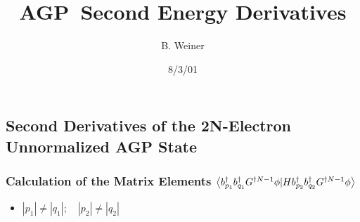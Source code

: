 

\newtheorem{theorem}{Theorem}
\newtheorem{acknowledgement}[theorem]{Acknowledgement}
\newtheorem{algorithm}[theorem]{Algorithm}
\newtheorem{axiom}[theorem]{Axiom}
\newtheorem{claim}[theorem]{Claim}
\newtheorem{conclusion}[theorem]{Conclusion}
\newtheorem{condition}[theorem]{Condition}
\newtheorem{conjecture}[theorem]{Conjecture}
\newtheorem{corollary}[theorem]{Corollary}
\newtheorem{criterion}[theorem]{Criterion}
\newtheorem{definition}[theorem]{Definition}
\newtheorem{example}[theorem]{Example}
\newtheorem{exercise}[theorem]{Exercise}
\newtheorem{lemma}[theorem]{Lemma}
\newtheorem{notation}[theorem]{Notation}
\newtheorem{problem}[theorem]{Problem}
\newtheorem{proposition}[theorem]{Proposition}
\newtheorem{remark}[theorem]{Remark}
\newtheorem{solution}[theorem]{Solution}
\newtheorem{summary}[theorem]{Summary}


\title{AGP\ Second Energy Derivatives}
\author{B. Weiner}
\address{}
\date{8/3/01}
\maketitle
\pacs{}

\begin{abstract}
\end{abstract}

\subsection{Second Derivatives of the 2N-Electron Unnormalized AGP State }

\subsubsection{Calculation of the Matrix Elements $\left\langle
b_{p_{1}}^{\dagger }b_{q_{1}}^{\dagger }G^{\dagger N-1}\protect\phi %
|Hb_{p_{2}}^{\dagger }b_{q_{2}}^{\dagger }G^{\dagger N-1}\protect\phi %
\right\rangle $}

\begin{itemize}
\item $\left| p_{1}\right| \neq \left| q_{1}\right| ;\quad \left|
p_{2}\right| \neq \left| q_{2}\right| $
\end{itemize}

